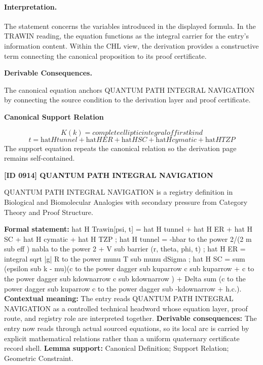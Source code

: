 \paragraph{Interpretation.}
The statement concerns the variables introduced in the displayed formula. In the TRAWIN reading, the equation functions as the integral carrier for the entry’s information content. Within the CHL view, the derivation provides a constructive term connecting the canonical proposition to its proof certificate.

\par\vspace{0.35em}
\noindent\textbf{Derivable Consequences.}\quad
\begingroup
\footnotesize
\raggedright
The canonical equation anchors QUANTUM PATH INTEGRAL NAVIGATION by connecting the source condition to the derivation layer and proof certificate.
\par\endgroup

\noindent\textbf{Canonical Support Relation}\par
\[
K(k) = complete elliptic integral of first kind
\]
\[
t = \mathrm{hat}{H}tunnel + \mathrm{hat}{H}ER + \mathrm{hat}{H}SC + \mathrm{hat}{H}cymatic + \mathrm{hat}{H}TZP
\]
\noindent The support equation repeats the canonical relation so the derivation page remains self-contained.\par

\clearpage
\noindent\textbf{[ID 0914] QUANTUM PATH INTEGRAL NAVIGATION}\par
\vspace{0.35em}
\begingroup\small
{}
QUANTUM PATH INTEGRAL NAVIGATION is a registry definition in Biological and Biomolecular Analogies with secondary pressure from Category Theory and Proof Structure.

\begingroup\footnotesize\setlength{\emergencystretch}{3em}\sloppy
\textbf{Formal statement:} hat H Trawin[psi, t] = hat H tunnel + hat H ER + hat H SC + hat H cymatic + hat H TZP ; hat H tunnel = -hbar to the power 2/(2 m sub eff ) nabla to the power 2 + V sub barrier (r, theta, phi, t) ; hat H ER = integral sqrt |g| R to the power munu T sub munu dSigma ; hat H SC = sum (epsilon sub k - mu)(c to the power dagger sub kuparrow c sub kuparrow + c to the power dagger sub kdownarrow c sub kdownarrow ) + Delta sum (c to the power dagger sub kuparrow c to the power dagger sub -kdownarrow + h.c.). \textbf{Contextual meaning:} The entry reads QUANTUM PATH INTEGRAL NAVIGATION as a controlled technical headword whose equation layer, proof route, and registry role are interpreted together. \textbf{Derivable consequences:} The entry now reads through actual sourced equations, so its local arc is carried by explicit mathematical relations rather than a uniform quaternary certificate record shell. \textbf{Lemma support:} Canonical Definition; Support Relation; Geometric Constraint.\par
\endgroup

